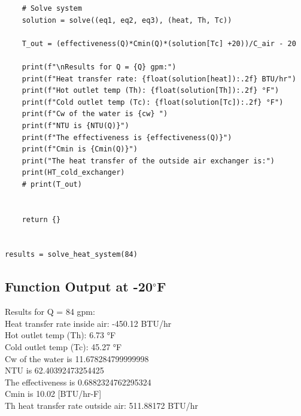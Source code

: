 \documentclass{article}
\begin{document}
\begin{lstlisting}
    # Solve system
    solution = solve((eq1, eq2, eq3), (heat, Th, Tc))

    T_out = (effectiveness(Q)*Cmin(Q)*(solution[Tc] +20))/C_air - 20
    
    print(f"\nResults for Q = {Q} gpm:")
    print(f"Heat transfer rate: {float(solution[heat]):.2f} BTU/hr")
    print(f"Hot outlet temp (Th): {float(solution[Th]):.2f} °F")
    print(f"Cold outlet temp (Tc): {float(solution[Tc]):.2f} °F")
    print(f"Cw of the water is {cw} ")
    print(f"NTU is {NTU(Q)}")
    print(f"The effectiveness is {effectiveness(Q)}")
    print(f"Cmin is {Cmin(Q)}")
    print("The heat transfer of the outside air exchanger is:")
    print(HT_cold_exchanger)
    # print(T_out)
    
    
    return {}


results = solve_heat_system(84)
\end{lstlisting}

\subsection{Function Output at -20$^{\circ}$F}

Results for Q = 84 gpm:\\
Heat transfer rate inside air: -450.12 BTU/hr \\
Hot outlet temp (Th): 6.73 °F \\
Cold outlet temp (Tc): 45.27 °F \\
Cw of the water is 11.678284799999998  \\
NTU is 62.40392473254425 \\
The effectiveness is 0.6882324762295324 \\
Cmin is 10.02 [BTU/hr-F]\\
Th heat transfer rate outside air: 511.88172 BTU/hr \\
\end{document}

